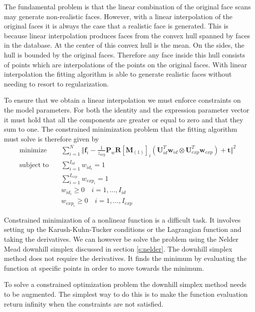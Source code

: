 \documentclass[11pt,a4paper]{report}
\begin{document}
The fundamental problem is that the linear
combination of the original face scans may generate non-realistic faces. However, with a linear interpolation of
the original faces it is always the case that a realistic face is
generated. This is because linear interpolation produces faces from the convex hull spanned by
faces in the database. At the center of this convex hull is the mean. On the
sides, the hull
is bounded by the original faces. Therefore any face inside this hull consists
of points which are interpolations of the points on the original faces. With linear interpolation the fitting algorithm is able to generate realistic faces without needing to resort to regularization.

To ensure that we obtain a linear interpolation we must enforce constraints on
the model parameters. For both the identity and the expression parameter vector
it must hold that all the components are greater or equal to zero and
that they sum to one. The constrained minimization problem that the fitting
algorithm must solve is therefore given by
\begin{align}\label{eq:optprob}
\mathrm{minimize}\quad &\sum_{i=1}^N \Big\Vert\mathbf{f}_i - \frac{1}{z_{avg}}\mathbf{P}_w\mathbf{R}[\mathbf{M}_{(1)}]_{i}(\mathbf{U}_{id}^T\mathbf{w}_{id} \otimes
\mathbf{U}_{exp}^T\mathbf{w}_{exp}) + \mathbf{t}\Big\Vert^2\\
\mathrm{subject\; to}\quad &\sum_{i=1}^{I_{id}} w_{id_i} = 1\\
&\sum_{i=1}^{I_{exp}} w_{exp_i} = 1\\
\label{eq:nonneg1}
&w_{id_i} \ge 0 \quad i=1,\ldots ,I_{id}\\\label{eq:nonneg2}
&w_{exp_i} \ge 0 \quad i=1,\ldots ,I_{exp}
\end{align}

Constrained minimization of a nonlinear function is a difficult task. It
involves setting up the Karush-Kuhn-Tucker conditions or the Lagrangian function
and taking the derivatives. We can however be solve the problem using the Nelder
Mead downhill simplex discussed in section \ref{s:nelder}. The downhill simplex
method does not require the derivatives. It finds the minimum by evaluating the
function at specific points in order to move towards the minimum. 

To solve a constrained optimization problem the downhill simplex method needs to
be augmented. The simplest way to do this is to make the function evaluation
return infinity when the constraints are not satisfied. 
\end{document}
